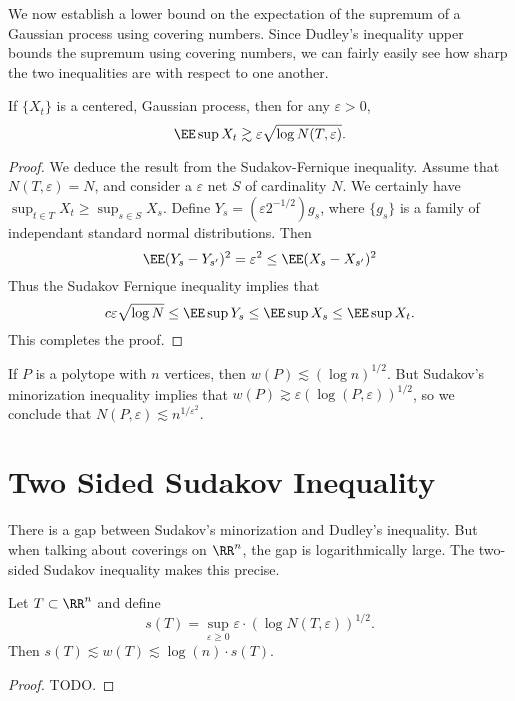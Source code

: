 We now establish a lower bound on the expectation of the supremum of a Gaussian process using covering numbers. Since Dudley's inequality upper bounds the supremum using covering numbers, we can fairly easily see how sharp the two inequalities are with respect to one another.

\begin{theorem}
	If $\{ X_t \}$ is a centered, Gaussian process, then for any $\varepsilon > 0$,
	\[ \EE \sup X_t \gtrsim \varepsilon \sqrt{\log N(T,\varepsilon)}. \]
\end{theorem}
\begin{proof}
	We deduce the result from the Sudakov-Fernique inequality. Assume that $N(T,\varepsilon) = N$, and consider a $\varepsilon$ net $S$ of cardinality $N$. We certainly have $\sup_{t \in T} X_t \geq \sup_{s \in S} X_s$. Define $Y_s = (\varepsilon 2^{-1/2}) g_s$, where $\{ g_s \}$ is a family of independant standard normal distributions. Then
	\[ \EE (Y_s - Y_{s'})^2 = \varepsilon^2 \leq \EE (X_s - X_{s'})^2 \]
	Thus the Sudakov Fernique inequality implies that
	\[ c \varepsilon \sqrt{\log N} \leq \EE \sup Y_s \leq \EE \sup X_s \leq \EE \sup X_t. \]
	This completes the proof.
\end{proof}

\begin{example}
	If $P$ is a polytope with $n$ vertices, then $w(P) \lesssim (\log n)^{1/2}$. But Sudakov's minorization inequality implies that $w(P) \gtrsim \varepsilon (\log(P,\varepsilon))^{1/2}$, so we conclude that $N(P,\varepsilon) \lesssim n^{1/\varepsilon^2}$.
\end{example}

\section{Two Sided Sudakov Inequality}

There is a gap between Sudakov's minorization and Dudley's inequality. But when talking about coverings on $\RR^n$, the gap is logarithmically large. The two-sided Sudakov inequality makes this precise.

\begin{theorem}
	Let $T \subset \RR^n$ and define
	\[ s(T) = \sup_{\varepsilon \geq 0} \varepsilon \cdot (\log N(T,\varepsilon))^{1/2}. \]
	Then $s(T) \lesssim w(T) \lesssim \log(n) \cdot s(T)$.
\end{theorem}
\begin{proof}
	TODO.
\end{proof}


